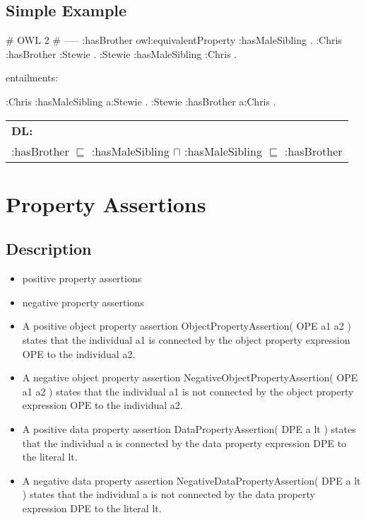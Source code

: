 \documentclass{llncs}
\newenvironment{DL}{
  \scriptsize
  \sffamily
  \vspace{0.3cm}
  \begin{tabular}{l}
	\textbf{DL:} \\

}{
  \end{tabular}
  \linebreak
}
\begin{document}
\subsection{Simple Example}

\begin{ex}
# OWL 2
# -----
:hasBrother owl:equivalentProperty :hasMaleSibling . 
:Chris :hasBrother :Stewie . 
:Stewie :hasMaleSibling :Chris .
\end{ex}

entailments:

\begin{ex}
:Chris :hasMaleSibling a:Stewie . 
:Stewie :hasBrother a:Chris .
\end{ex}

\begin{DL}
:hasBrother $\sqsubseteq$ :hasMaleSibling $\sqcap$ :hasMaleSibling $\sqsubseteq$ :hasBrother \\
\end{DL}

\section{Property Assertions}

\subsection{Description}

\begin{itemize}
	\item positive property assertions
  \item negative property assertions
	\item A positive object property assertion ObjectPropertyAssertion( OPE a1 a2 ) states that the individual a1 is connected by the object property expression OPE to the individual a2. 
	\item A negative object property assertion NegativeObjectPropertyAssertion( OPE a1 a2 ) states that the individual a1 is not connected by the object property expression OPE to the individual a2. 
	\item A positive data property assertion DataPropertyAssertion( DPE a lt ) states that the individual a is connected by the data property expression DPE to the literal lt. 
	\item A negative data property assertion NegativeDataPropertyAssertion( DPE a lt ) states that the individual a is not connected by the data property expression DPE to the literal lt.
\end{itemize}
\end{document}
